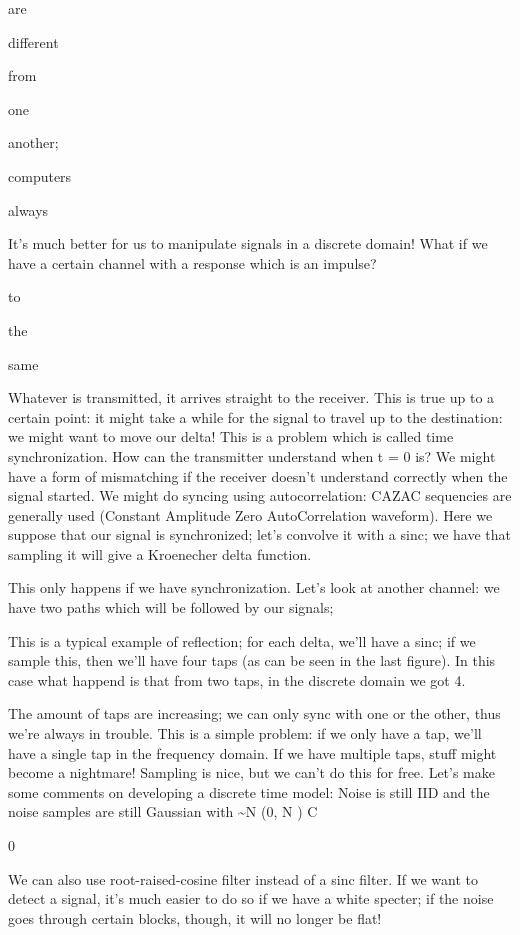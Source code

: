 {are

different

from

one

another;

computers

always

It's much better for us to manipulate signals in a discrete domain!
What if we have a certain channel with a response which is an impulse?

to

the

same

Whatever is transmitted, it arrives straight to the receiver.
This is true up to a certain point: it might take a while for the signal to travel up to the destination: we might want to move our delta! This is a problem which is called time synchronization.
How can the transmitter understand when t = 0 is? We might have a form of mismatching if the receiver doesn't understand correctly when the signal started.
We might do syncing using autocorrelation: CAZAC sequencies are generally used
(Constant Amplitude Zero AutoCorrelation waveform).
Here we suppose that our signal is synchronized; let's convolve it with a sinc; we have that sampling it will give a Kroenecher delta function.

This only happens if we have synchronization.
Let's look at another channel: we have two paths which will be followed by our signals;

This is a typical example of reflection; for each delta, we'll have a sinc; if we sample this, then we'll have four taps (as can be seen in the last figure).
In this case what happend is that from two taps, in the discrete domain we got 4.

The amount of taps are increasing; we can only sync with one or the other, thus we're always in trouble.
This is a simple problem: if we only have a tap, we'll have a single tap in the frequency domain.
If we have multiple taps, stuff might become a nightmare!
Sampling is nice, but we can't do this for free.
Let's make some comments on developing a discrete time model:
Noise is still IID and the noise samples are still Gaussian with \sim N (0, N )
C

0

We can also use root-raised-cosine filter instead of a sinc filter.
If we want to detect a signal, it's much easier to do so if we have a white specter;
if the noise goes through certain blocks, though, it will no longer be flat!

}
